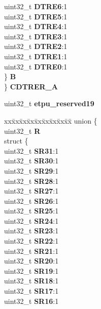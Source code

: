 \begin{DoxyCompactItemize}
\begin{tabbing}
\>\>uint32\_t {\bfseries DTRE6}:1\\
\>\>uint32\_t {\bfseries DTRE5}:1\\
\>\>uint32\_t {\bfseries DTRE4}:1\\
\>\>uint32\_t {\bfseries DTRE3}:1\\
\>\>uint32\_t {\bfseries DTRE2}:1\\
\>\>uint32\_t {\bfseries DTRE1}:1\\
\>\>uint32\_t {\bfseries DTRE0}:1\\
\>\} {\bfseries B}\\
\} {\bfseries CDTRER\_A}\\

\end{tabbing}\item 
\mbox{\label{structETPU__tag_a704d46b6206249233b9ed56aaa8edcfd}} 
uint32\+\_\+t {\bfseries etpu\+\_\+reserved19}
\item 
\mbox{\label{structETPU__tag_ac4b577850afb362fc8fd62bc98616838}} 
\begin{tabbing}
xx\=xx\=xx\=xx\=xx\=xx\=xx\=xx\=xx\=\kill
union \{\\
\>uint32\_t {\bfseries R}\\
\>struct \{\\
\>\>uint32\_t {\bfseries SR31}:1\\
\>\>uint32\_t {\bfseries SR30}:1\\
\>\>uint32\_t {\bfseries SR29}:1\\
\>\>uint32\_t {\bfseries SR28}:1\\
\>\>uint32\_t {\bfseries SR27}:1\\
\>\>uint32\_t {\bfseries SR26}:1\\
\>\>uint32\_t {\bfseries SR25}:1\\
\>\>uint32\_t {\bfseries SR24}:1\\
\>\>uint32\_t {\bfseries SR23}:1\\
\>\>uint32\_t {\bfseries SR22}:1\\
\>\>uint32\_t {\bfseries SR21}:1\\
\>\>uint32\_t {\bfseries SR20}:1\\
\>\>uint32\_t {\bfseries SR19}:1\\
\>\>uint32\_t {\bfseries SR18}:1\\
\>\>uint32\_t {\bfseries SR17}:1\\
\>\>uint32\_t {\bfseries SR16}:1\\

\end{tabbing}
\end{DoxyCompactItemize}

